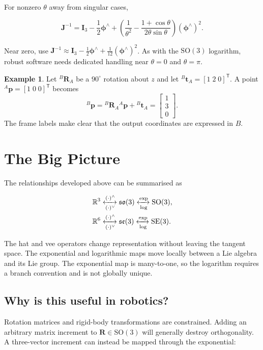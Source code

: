 \documentclass[10pt,a4paper]{article}
\numberwithin{equation}{section}
\newcommand{\Section}[1]{\section{#1}}
\newcommand{\Subsection}[1]{\subsection{#1}}
\newcommand{\SOthree}{\mathrm{SO}(3)}
\newcommand{\SEthree}{\mathrm{SE}(3)}
\newcommand{\sothree}{\mathfrak{so}(3)}
\newcommand{\sethree}{\mathfrak{se}(3)}
\newcommand{\vect}[1]{\boldsymbol{#1}}
\theoremstyle{definition}
\newtheorem{example}{Example}[section]
\theoremstyle{exercisestyle}
\begin{document}
For nonzero $\theta$ away from singular cases,

\begin{equation}
    \mathbf{J}^{-1}
    =\mathbf{I}_3-\frac12\vect{\phi}^\wedge
    +\left(
    \frac{1}{\theta^2}
    -\frac{1+\cos\theta}{2\theta\sin\theta}
    \right)(\vect{\phi}^\wedge)^2.
\end{equation}

Near zero, use
$\mathbf{J}^{-1}\approx\mathbf{I}_3-\tfrac12\vect{\phi}^\wedge+
    \tfrac1{12}(\vect{\phi}^\wedge)^2$. As with the $\SOthree$ logarithm, robust
software needs dedicated handling near $\theta=0$ and $\theta=\pi$.

\begin{example}
    Let ${}^B\mathbf{R}_A$ be a $90^\circ$ rotation about $z$ and let
    ${}^B\mathbf{t}_A=[1\;2\;0]^{\mathsf T}$. A point
    ${}^A\mathbf{p}=[1\;0\;0]^{\mathsf T}$ becomes
    \begin{equation}
        {}^B\mathbf{p}
        ={}^B\mathbf{R}_A{}^A\mathbf{p}+{}^B\mathbf{t}_A
        =\begin{bmatrix}1\\3\\0\end{bmatrix}.
    \end{equation}
    The frame labels make clear that the output coordinates are expressed in $B$.
\end{example}

\Section{The Big Picture}

The relationships developed above can be summarised as

\begin{align}
    \mathbb{R}^3
     & \xleftrightarrow[(\cdot)^\vee]{(\cdot)^\wedge}
    \sothree
    \xleftrightarrow[\log]{\exp}
    \SOthree,                                         \\
    \mathbb{R}^6
     & \xleftrightarrow[(\cdot)^\vee]{(\cdot)^\wedge}
    \sethree
    \xleftrightarrow[\log]{\exp}
    \SEthree.
\end{align}

The hat and vee operators change representation without leaving the tangent
space. The exponential and logarithmic maps move locally between a Lie algebra
and its Lie group. The exponential map is many-to-one, so the logarithm requires
a branch convention and is not globally unique.

\Subsection{Why is this useful in robotics?}

Rotation matrices and rigid-body transformations are constrained. Adding an
arbitrary matrix increment to $\mathbf{R}\in\SOthree$ will generally destroy
orthogonality. A three-vector increment can instead be mapped through the
exponential:
\end{document}
